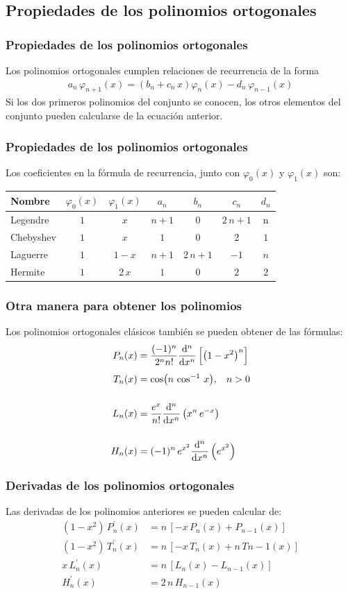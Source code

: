 \subsection*{Propiedades de los polinomios ortogonales}
\begin{frame}
\frametitle{Propiedades de los polinomios ortogonales}
Los polinomios ortogonales cumplen relaciones de recurrencia de la forma
\begin{align*}
a_{n} \, \varphi_{n+1} (x) = (b_{n} + c_{n} \, x) \varphi_{n} (x) - d_{n} \, \varphi_{n-1} (x)
\end{align*}
Si los dos primeros polinomios del conjunto se conocen, los otros elementos del conjunto pueden calcularse de la ecuación anterior. 
\end{frame}
\begin{frame}
\frametitle{Propiedades de los polinomios ortogonales}
Los coeficientes en la fórmula de recurrencia, junto con $\varphi_{0}(x)$ y $\varphi_{1}(x)$ son:
\fontsize{12}{12}\selectfont
\begin{tabular}{| l | c | c | c | c | c | c |}
\hline
Nombre & $\varphi_{0}(x)$ & $\varphi_{1}(x)$ & $a_{n}$ & $b_{n}$ & $c_{n}$ & $d_{n}$ \\ \hline
Legendre & $1$ & $x$ & $n+1$ & $0$ & $2\, n + 1$ & n \\
Chebyshev & $1$ & $x$ & $1$ & $0$ & $2$ & $1$ \\
Laguerre & $1$ & $1 - x$ & $n + 1$ & $2 \, n + 1$ & $-1$ & $n$ \\
Hermite & $1$ & $2 \, x$ & $1$ & $0$ & $2$ & $2$ \\ \hline
\end{tabular}
\end{frame}
\begin{frame}
\frametitle{Otra manera para obtener los polinomios}
Los polinomios ortogonales clásicos también se pueden obtener de las fórmulas:
\begin{align*}
P_{n}(x) &= \dfrac{(-1)^{n}}{2^{n}n!} \dv[n]{x} \left[ \left( 1 - x^{2} \right)^{n} \right] \\[0.5em]
T_{n}(x) &= \cos(n \, \cos^{-1} \, x), \hspace{0.3cm} n > 0 \\[0.5cm]
L_{n}(x) &= \dfrac{e^{x}}{n!} \dv[n]{x} \left( x^{n} \, e^{-x} \right) \\[0.5cm]
H_{n}(x) &= (-1)^{n} \, e^{x^{2}} \dv[n]{x} \left(e^{x^{2}} \right)
\end{align*}
\end{frame}
\begin{frame}
\frametitle{Derivadas de los polinomios ortogonales}
Las derivadas de los polinomios anteriores se pueden calcular de:
\begin{align*}
(1-x^{2}) \, P^{\prime}_{n}(x) &= n \, [-x \, P_{n}(x) + P_{n-1}(x) ] \\[0.5em]
(1-x^{2}) \, T^{\prime}_{n}(x) &= n \, [-x \, T_{n}(x) + n \, T{n-1}(x) ] \\[0.5em]
x \, L^{\prime}_{n} (x) &= n \, [ L_{n}(x) - L_{n-1}(x) ] \\[0.5em]
H^{\prime}_{n}(x) &= 2 \, n \, H_{n-1}(x)
\end{align*}
\end{frame}
